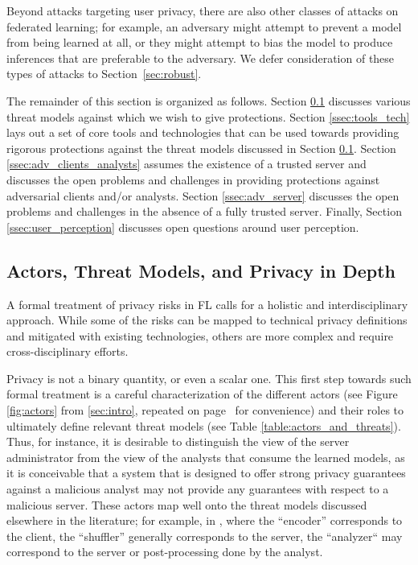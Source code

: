 \documentclass[11pt]{article}
\begin{document}
Beyond attacks targeting user privacy, there are also other classes of attacks on federated learning; for example, an adversary might attempt to prevent a model from being learned at all, or they might attempt to bias the model to produce inferences that are preferable to the adversary.  We defer consideration of these types of attacks to Section~\ref{sec:robust}.

The remainder of this section is organized as follows. Section \ref{ssec:actors_threat_models} discusses various threat models against which we wish to give protections. Section \ref{ssec:tools_tech} lays out a set of core tools and technologies that can be used towards providing rigorous protections against the threat models discussed in Section \ref{ssec:actors_threat_models}. Section \ref{ssec:adv_clients_analysts} assumes the existence of a trusted server and discusses the open problems and challenges in providing protections against adversarial clients and/or analysts. Section \ref{ssec:adv_server} discusses the open problems and challenges in the absence of a fully trusted server. Finally, Section \ref{ssec:user_perception} discusses open questions around user perception. 

\subsection{Actors, Threat Models, and Privacy in Depth}
\label{ssec:actors_threat_models}

A formal treatment of privacy risks in FL calls for a holistic and interdisciplinary approach. While some of the risks can be mapped to technical privacy definitions and mitigated with existing technologies, others are more complex and require cross-disciplinary efforts. 

Privacy is not a binary quantity, or even a scalar one. This first step towards such formal treatment is a careful characterization of the different actors (see Figure \ref{fig:actors} from \cref{sec:intro}, repeated on page~\pageref{fig:actors_repeat} for convenience) and their roles to ultimately define relevant threat models (see Table \ref{table:actors_and_threats}). Thus, for instance, it is desirable to distinguish the view of the server administrator from the view of the analysts that consume the learned models, as it is conceivable that a system that is designed to offer strong privacy guarantees against a malicious analyst may not provide any guarantees with respect to a malicious server. These actors map well onto the threat models discussed elsewhere in the literature; for example, in \citet[Sec 3.1]{prochlo}, where the ``encoder'' corresponds to the client, the ``shuffler'' generally corresponds to the server, the ``analyzer`` may correspond to the server or post-processing done by the analyst.
\end{document}
